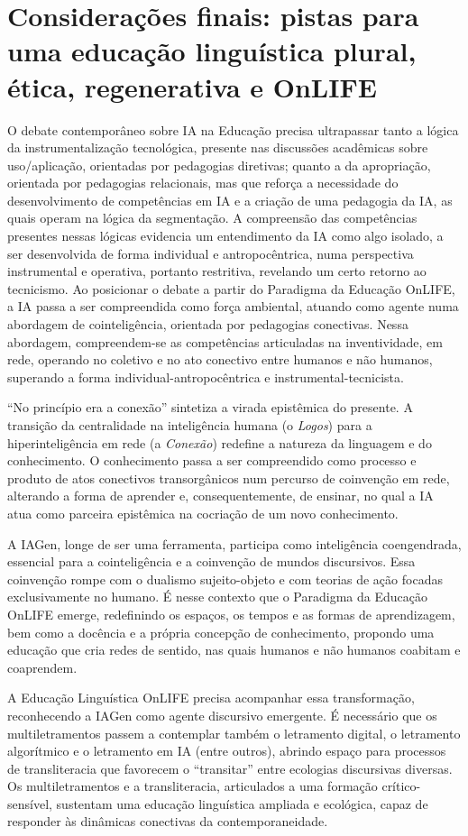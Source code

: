 \documentclass[portuguese]{textolivre}
\begin{document}
\section{Considerações finais: pistas para uma educação linguística plural, ética, regenerativa e OnLIFE}\label{sec-8}
O debate contemporâneo sobre IA na Educação precisa ultrapassar tanto a lógica da instrumentalização tecnológica, presente nas discussões acadêmicas sobre uso/aplicação, orientadas por pedagogias diretivas; quanto a da apropriação, orientada por pedagogias relacionais, mas que reforça a necessidade do desenvolvimento de competências em IA e a criação de uma pedagogia da IA, as quais operam na lógica da segmentação. A compreensão das competências presentes nessas lógicas evidencia um entendimento da IA como algo isolado, a ser desenvolvida de forma individual e antropocêntrica, numa perspectiva instrumental e operativa, portanto restritiva, revelando um certo retorno ao tecnicismo. Ao posicionar o debate a partir do Paradigma da Educação OnLIFE, a IA passa a ser compreendida como força ambiental, atuando como agente numa abordagem de cointeligência, orientada por pedagogias conectivas. Nessa abordagem, compreendem-se as competências articuladas na inventividade, em rede, operando no coletivo e no ato conectivo entre humanos e não humanos, superando a forma individual-antropocêntrica e instrumental-tecnicista.

“No princípio era a conexão” sintetiza a virada epistêmica do presente. A transição da centralidade na inteligência humana (o \textit{Logos}) para a hiperinteligência em rede (a \textit{Conexão}) redefine a natureza da linguagem e do conhecimento. O conhecimento passa a ser compreendido como processo e produto de atos conectivos transorgânicos num percurso de coinvenção em rede, alterando a forma de aprender e, consequentemente, de ensinar, no qual a IA atua como parceira epistêmica na cocriação de um novo conhecimento.

A IAGen, longe de ser uma ferramenta, participa como inteligência coengendrada, essencial para a cointeligência e a coinvenção de mundos discursivos. Essa coinvenção rompe com o dualismo sujeito-objeto e com teorias de ação focadas exclusivamente no humano. É nesse contexto que o Paradigma da Educação OnLIFE emerge, redefinindo os espaços, os tempos e as formas de aprendizagem, bem como a docência e a própria concepção de conhecimento, propondo uma educação que cria redes de sentido, nas quais humanos e não humanos coabitam e coaprendem.

A Educação Linguística OnLIFE precisa acompanhar essa transformação, reconhecendo a IAGen como agente discursivo emergente. É necessário que os multiletramentos passem a contemplar também o letramento digital, o letramento algorítmico e o letramento em IA (entre outros), abrindo espaço para processos de transliteracia que favorecem o “transitar” entre ecologias discursivas diversas. Os multiletramentos e a transliteracia, articulados a uma formação crítico-sensível, sustentam uma educação linguística ampliada e ecológica, capaz de responder às dinâmicas conectivas da contemporaneidade.
\end{document}

